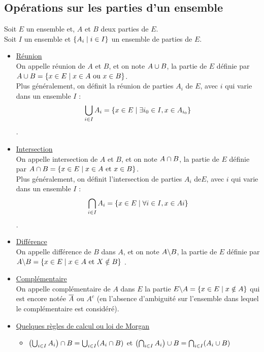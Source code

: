 \subsection{Opérations sur les parties d’un ensemble}
\begin{defprop}
Soit \(E\) un ensemble et, \(A\) et \(B\) deux parties de \(E\).\\
Soit \(I\) un ensemble et \(\left\lbrace A_i \;\middle|\; i \in I\right\rbrace\) un ensemble de parties de \(E\).
\begin{itemize}
    \item  \underline{Réunion}\\ 
        On appelle réunion de \(A\) et \(B\), et on note \(A\cup B\), la partie de \(E\) définie par \\\(A\cup B = \left\lbrace x \in E \;\middle|\; x \in A \text{ ou } x \in B\right\rbrace\).\\
        Plus généralement, on définit la réunion de parties \(A_i\) de \(E\), avec \(i\) qui varie dans un ensemble \(I\) : \[ \bigcup_{i\in I}A_i = \left\lbrace x \in E \;\middle|\; \exists i_0 \in I, x \in A_{i_0} \right\rbrace\] .
    \item \underline{ Intersection}\\ 
        On appelle intersection de \(A\) et \(B\), et on note \(A\cap B\), la partie de \(E\) définie par \(A \cap B = \left\lbrace x \in E \;\middle|\; x \in A \text{ et } x \in B\right\rbrace\).\\
        Plus généralement, on définit l’intersection de parties \(A_i\) de\( E\), avec \(i\) qui varie dans un ensemble \(I\) :\[ \bigcap_{i\in I}A_i = \left\lbrace x \in E \;\middle|\; \forall i \in I, x \in A{i} \right\rbrace\].
    \item \underline{ Différence}\\ On appelle différence de \(B\) dans \(A\), et on note \(A \backslash B\), la partie de \(E\) définie par \(A\backslash B = \left\lbrace x \in E \;\middle|\; x \in A \text{ et } X\notin B\right\rbrace\) .
    \item \underline{Complémentaire}\\ 
    On appelle complémentaire de \(A\) dans \(E\) la partie \(E \backslash A = \left\lbrace x \in E \;\middle|\; x \notin A\right\rbrace\) qui est encore notée \(\overline{A}\) ou \(A^c\) (en l’absence d’ambiguité sur l’ensemble dans lequel le complémentaire est considéré).
    \item \underline{ Quelques règles de calcul ou loi de Morgan}\\
    \begin{itemize}
        \item \(\left(\bigcup_{i\in I}A_i\right)\cap B = \bigcup_{i \in I} (A_i \cap B)\) et \(  \left(\bigcap_{i\in I} A_i\right) \cup B = \bigcap_{i\in I}(A_i \cup B)\)

\end{itemize}
\end{itemize}
\end{defprop}
